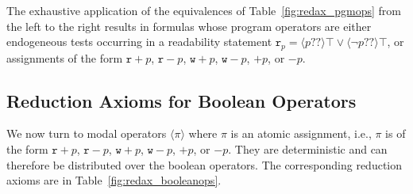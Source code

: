 \documentclass{llncs}
\newcommand{\readable}[1]{\mathtt{r}_{#1}}
\newcommand{\writable}[1]{\mathtt{w}_{#1}}
\newcommand{\testendo}{?\!\!?}			%
\newcommand{\assgntopR}[1]{{\mathtt r {+} #1}}
\newcommand{\assgnbotR}[1]{{\mathtt r {-} #1}}
\newcommand{\assgntopW}[1]{{\mathtt w {+} #1}}
\newcommand{\assgnbotW}[1]{{\mathtt w {-} #1}}
\newcommand{\assgntopV}[1]{{\mathtt {+} #1}}
\newcommand{\assgnbotV}[1]{{\mathtt {-} #1}}
\newcommand{\ldia}[1]{ \big\langle #1 \big\rangle}
\begin{document}
The exhaustive application of the equivalences of Table~\ref{fig:redax_pgmops} from the left to the right 
results in formulas whose program operators are either endogeneous tests occurring in a readability statement
$\readable p = \ldia{p \testendo} \top \lor \ldia{\lnot p \testendo} \top$, or 
assignments of the form
$\assgntopR p $, $\assgnbotR p $,
$\assgntopW p $, $\assgnbotW p $, 
$\assgntopV p $, or $\assgnbotV p $. 


\subsection{Reduction Axioms for Boolean Operators}\label{sec:redax_atmpgm_bool} 

We now turn to modal operators $\ldia \pi$ where $\pi$ is an atomic assignment, i.e., $\pi$ is of the form 
$\assgntopR p $, $\assgnbotR p $,
$\assgntopW p $, $\assgnbotW p $, 
$\assgntopV p $, or $\assgnbotV p $. 
They are deterministic and can therefore be distributed over the boolean operators.
The corresponding reduction axioms are in Table~\ref{fig:redax_booleanops}.
\end{document}
